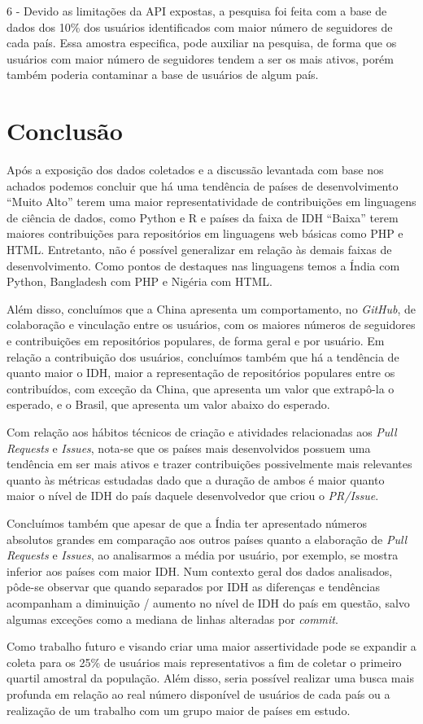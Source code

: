 \documentclass[12pt]{article}
\begin{document}
6 - Devido as limitações da API expostas, a pesquisa foi feita com a base de dados dos 10\% dos usuários identificados com maior número de seguidores de cada país. Essa amostra especifica, pode auxiliar na pesquisa, de forma que os usuários com maior número de seguidores tendem a ser os mais ativos, porém também poderia contaminar a base de usuários de algum país.

\section{Conclusão} \label{sec:conclusion}
Após a exposição dos dados coletados e a discussão levantada com base nos achados podemos concluir que há uma tendência de países de desenvolvimento ``Muito Alto'' terem uma maior representatividade de contribuições em linguagens de ciência de dados, como Python e R e países da faixa de IDH ``Baixa'' terem maiores contribuições para repositórios em linguagens web básicas como PHP e HTML. Entretanto, não é possível generalizar em relação às demais faixas de desenvolvimento. Como pontos de destaques nas linguagens temos a Índia com Python, Bangladesh com PHP e Nigéria com HTML.

Além disso, concluímos que a China apresenta um comportamento, no \textit{GitHub}, de colaboração e vinculação entre os usuários, com os maiores números de seguidores e contribuições em repositórios populares, de forma geral e por usuário. Em relação a contribuição dos usuários, concluímos também que há a tendência de quanto maior o IDH, maior a representação de repositórios populares entre os contribuídos, com exceção da China, que apresenta um valor que extrapô-la o esperado, e o Brasil, que apresenta um valor abaixo do esperado.

Com relação aos hábitos técnicos de criação e atividades relacionadas aos \textit{Pull Requests} e \textit{Issues}, nota-se que os países mais desenvolvidos possuem uma tendência em ser mais ativos e trazer contribuições possivelmente mais relevantes quanto às métricas estudadas dado que a duração de ambos é maior quanto maior o nível de IDH do país daquele desenvolvedor que criou o  \textit{PR/Issue}. 

Concluímos também que apesar de que a Índia ter apresentado números absolutos grandes em comparação aos outros países quanto a elaboração de \textit{Pull Requests} e \textit{Issues}, ao analisarmos a média por usuário, por exemplo, se mostra inferior aos países com maior IDH. Num contexto geral dos dados analisados, pôde-se observar que quando separados por IDH as diferenças e tendências acompanham a diminuição / aumento no nível de IDH do país em questão, salvo algumas exceções como a mediana de linhas alteradas por \textit{commit}. 

Como trabalho futuro e visando criar uma maior assertividade pode se expandir a coleta para os 25\% de usuários mais representativos a fim de coletar o primeiro quartil amostral da população. Além disso, seria possível realizar uma busca mais profunda em relação ao real número disponível de usuários de cada país ou a realização de um trabalho com um grupo maior de países em estudo.



\end{document}
